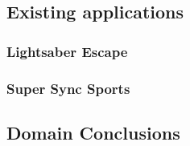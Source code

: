 \subsection{Existing applications}

\subsubsection{Lightsaber Escape} %

\subsubsection{Super Sync Sports} %

\subsection{Domain Conclusions}

\clearpage

